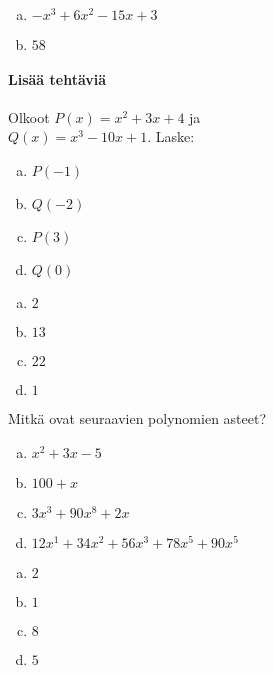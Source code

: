 \begin{tehtavasivu}
\begin{tehtava}
	\begin{vastaus}
		\begin{enumerate}[a)]
			\item $-x^3+6x^2-15x+3$
			\item $58$
	\end{enumerate}
	\end{vastaus}
\end{tehtava}


\paragraph*{Lisää tehtäviä}

\begin{tehtava}
    Olkoot $P(x)=x^2+3x+4$ ja \\ $Q(x)=x^3-10x+1$. Laske:
    \begin{enumerate}[a)]
        \item $P(-1)$
        \item $Q(-2)$
        \item $P(3)$
        \item $Q(0)$
    \end{enumerate}
    \begin{vastaus}
        \begin{enumerate}[a)]
            \item $2$
            \item $13$
            \item $22$
            \item $1$
        \end{enumerate}
    \end{vastaus}
\end{tehtava}


\begin{tehtava}
	Mitkä ovat seuraavien polynomien asteet?
	\begin{enumerate}[a)]
		\item $x^2 + 3x - 5$
		\item $100 + x$
		\item $3x^3 + 90x^8 + 2x$
		\item $12x^1 + 34x^2 + 56x^3 + 78x^5 + 90x^5$
	\end{enumerate}

	\begin{vastaus}
		\begin{enumerate}[a)]
			\item $2$
			\item $1$
			\item $8$
			\item $5$
		\end{enumerate}
	\end{vastaus}
\end{tehtava}


\end{tehtavasivu}

